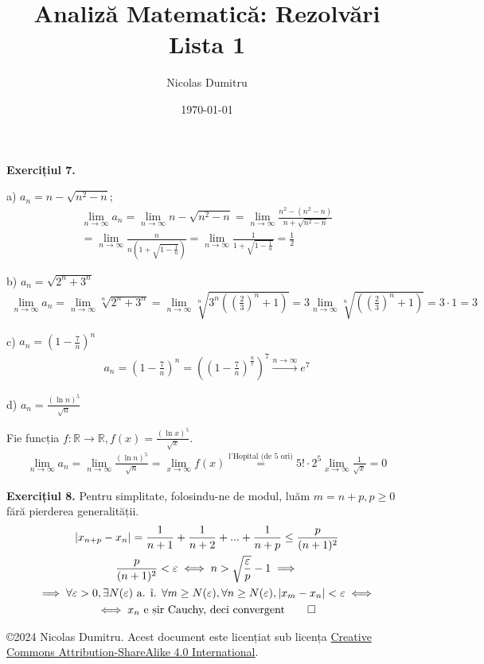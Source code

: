 \documentclass[a4paper]{article}
\title{Analiză Matematică: Rezolvări Lista 1}
\author{Nicolas Dumitru}
\date{\today}
\theoremstyle{definition}
\theoremstyle{plain} %
\theoremstyle{remark}
\newcommand{\seqlim}{\lim_{n \to \infty}}
\renewcommand{\epsilon}{\varepsilon} %
\begin{document}
\maketitle

\textbf{Exercițiul 7.}

a) \(a_n = n - \sqrt{n^2 - n}\);
\begin{gather*}
	\seqlim a_n = \seqlim n - \sqrt{n^2 - n}
	= \seqlim \frac{n^2 - (n^2 - n)}{n + \sqrt{n^2 - n}} \\
	= \seqlim \frac{n}{n\left(1 + \sqrt{1 - \frac{1}{n}}\right)}
	= \seqlim \frac{1}{1 + \sqrt{1 - \frac{1}{n}}} = \frac{1}{2}
\end{gather*}

b) \(a_n = \sqrt{2^n + 3^n}\)
\begin{gather*}
	\seqlim a_n = \seqlim \sqrt[n]{2^n + 3^n}
	= \seqlim \sqrt[n]{3^n \left(\left(\frac{2}{3}\right)^n + 1\right)}
	= 3 \seqlim \sqrt[n]{\left(\left(\frac{2}{3}\right)^n + 1\right)}
	= 3 \cdot 1 = 3
\end{gather*}

c) \(a_n = \left(1 - \frac{7}{n}\right)^n\)
\begin{gather*}
	a_n = \left(1 - \frac{7}{n}\right)^n = \left(\left(1 - \frac{7}{n}\right)^\frac{n}{7}\right)^7 \xrightarrow{n \to \infty} e^7
\end{gather*}


d) \(a_n = \frac{(\ln n)^5}{\sqrt n}\)

Fie funcția \(f: \mathbb R \to \mathbb R, f(x) = \frac{(\ln x)^5}{\sqrt x}\).
\begin{gather*}
	\seqlim a_n = \seqlim \frac{(\ln n)^5}{\sqrt n} = \lim_{x \to \infty} f(x) \overset{\text{l'Hopital (de 5 ori)}}{=} 5! \cdot 2^5 \lim_{x \to \infty} \frac{1}{\sqrt x} = 0
\end{gather*}

\textbf{Exercițiul 8.}
Pentru simplitate, folosindu-ne de modul, luăm \(m = n + p, p \ge 0\) fără pierderea generalității.
\begin{gather*}
	| x_{n + p} - x_n | = \frac{1}{n + 1} + \frac{1}{n + 2} + ... + \frac{1}{n
		+ p} \le \frac{p}{(n + 1)^2} \\
	\frac{p}{(n + 1)^2} < \epsilon \iff n > \sqrt{\frac{\epsilon}{p}} - 1 \implies \\
	\implies \forall \epsilon > 0, \exists N(\epsilon) \text{ a. î. } \forall m
	\ge N(\epsilon), \forall n \ge N(\epsilon), |x_m - x_n| < \epsilon \iff \\
    \iff x_n \text{ e șir Cauchy, deci convergent} \qed
\end{gather*}

\begin{flushright}
	\copyright 2024 Nicolas Dumitru.
	Acest document este licențiat sub licența \href{https://creativecommons.org/licenses/by-sa/4.0/}{Creative Commons Attribution-ShareAlike 4.0 International}.

\end{flushright}
\end{document}
